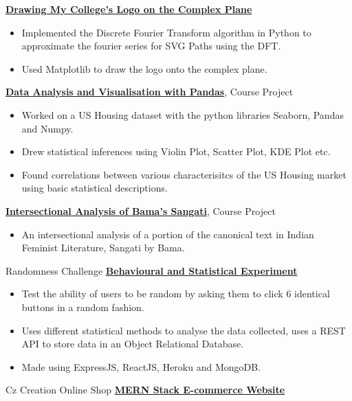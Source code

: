 {}
{\href{https://confumbit.github.io/posts/kmc-logo.html}{\textbf{Drawing My College's Logo on the Complex Plane}}}
{
    \begin{itemize}
        \item Implemented the Discrete Fourier Transform algorithm in Python to approximate the fourier series for SVG Paths using the DFT.
        \item Used Matplotlib to draw the logo onto the complex plane.
    \end{itemize}
}
%
%
{}
{\href{https://drive.google.com/file/d/1EF9wtUCJqQINYWiY4uFL4mmktJBL6r1b/view?usp=sharing}{\textbf{Data Analysis and Visualisation with Pandas}}, Course Project}
{
    \begin{itemize}
        \item Worked on a US Housing dataset with the python libraries Seaborn, Pandas and Numpy.
        \item Drew statistical inferences using Violin Plot, Scatter Plot, KDE Plot etc.
        \item Found correlations between various characterisitcs of the US Housing market using basic statistical descriptions.
    \end{itemize}
}
%
%
{}
{\href{https://drive.google.com/file/d/1O1eKscjk0mdHNJaD74NXsMMct6Itq04K/view?usp=sharing}{\textbf{Intersectional Analysis of Bama's Sangati}}, Course Project}
{
    \begin{itemize}
        \item An intersectional analysis of a portion of the canonical text in Indian Feminist Literature, Sangati by Bama.
    \end{itemize}
}
%
%
{Randomness Challenge}
{\href{https://randomnesschallenge-71zq.onrender.com/}{\textbf{Behavioural and Statistical Experiment}}}
{
    \begin{itemize}
        \item Test the ability of users to be random by asking them to click 6 identical buttons in a random fashion.
        \item Uses different statistical methods to analyse the data collected, uses a REST API to store data in an Object Relational Database.
        \item Made using ExpressJS, ReactJS, Heroku and MongoDB.
    \end{itemize}
}
%
%
{Cz Creation Online Shop}
{\href{https://czcreation.onrender.com/}{\textbf{MERN Stack E-commerce Website}}}
